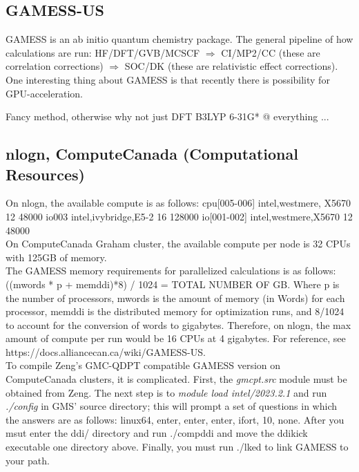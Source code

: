 \subsection{GAMESS-US}
GAMESS is an ab initio quantum chemistry package. The general pipeline of how calculations are run: HF/DFT/GVB/MCSCF $\Rightarrow$ CI/MP2/CC (these are correlation corrections) $\Rightarrow$ SOC/DK (these are relativistic effect corrections). One interesting thing about GAMESS is that recently there is possibility for GPU-acceleration. 

Fancy method, otherwise why not just DFT B3LYP 6-31G* @ everything ...
\newpage
    
    \subsection{nlogn, ComputeCanada (Computational Resources)}
    On nlogn, the available compute is as follows:
    cpu[005-006] intel,westmere, X5670 12 48000 io003 intel,ivybridge,E5-2 16 128000 io[001-002] intel,westmere,X5670 12 48000 \\

    On ComputeCanada Graham cluster, the available compute per node is 32 CPUs with 125GB of memory. \\

    The GAMESS memory requirements for parallelized calculations is as follows: ((mwords * p + memddi)*8) / 1024 = TOTAL NUMBER OF GB. Where p is the number of processors, mwords is the amount of memory (in Words) for each processor, memddi is the distributed memory for optimization runs, and 8/1024 to account for the conversion of words to gigabytes. Therefore, on nlogn, the max amount of compute per run would be 16 CPUs at 4 gigabytes. For reference, see https://docs.alliancecan.ca/wiki/GAMESS-US. \\

    To compile Zeng's GMC-QDPT compatible GAMESS version on ComputeCanada clusters, it is complicated. First, the \textit{gmcpt.src} module must be obtained from Zeng. The next step is to \textit{module load intel/2023.2.1} and run \textit{./config} in GMS' source directory; this will prompt a set of questions in which the answers are as follows: linux64, enter, enter, enter, ifort, 10, none. After you msut enter the ddi/ directory and run ./compddi and move the ddikick executable one directory above. Finally, you must run ./lked to link GAMESS to your path.
\newpage


